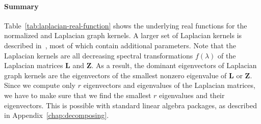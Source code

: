 \documentclass[11pt,a4paper]{book}
\newcommand{\syRank}{r}
\begin{document}
\paragraph{Summary}
Table~\ref{tab:laplacian-real-function} shows the underlying real
functions for the normalized and Laplacian graph kernels. 
A larger set of Laplacian kernels is described in~\cite{b152}, most of
which contain additional parameters. 
Note that the Laplacian kernels are all decreasing spectral
transformations $f(\lambda)$ of the Laplacian matrices $\mathbf L$ and
$\mathbf Z$. 
As a result,
the dominant eigenvectors of Laplacian graph kernels
are the eigenvectors of the smallest nonzero eigenvalue of $\mathbf L$ or
$\mathbf Z$.  Since we compute only $\syRank$ eigenvectors and eigenvalues of the
Laplacian matrices, we have to make sure that we find the smallest $\syRank$
eigenvalues and their eigenvectors.  This is possible with standard
linear algebra packages, as described in
Appendix~\ref{chap:decomposing}.  
\end{document}
